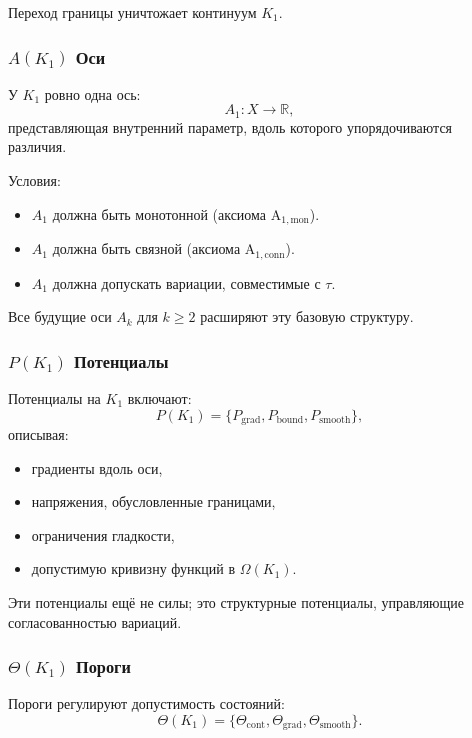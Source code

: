 Переход границы уничтожает континуум $K_1$.

\subsubsection{\texorpdfstring{$A(K_1)$}{A(K_1)} Оси}

У $K_1$ ровно одна ось:
\[
A_1 : X \to \mathbb{R},
\]
представляющая внутренний параметр, вдоль которого упорядочиваются
различия.

Условия:
\begin{itemize}
    \item $A_1$ должна быть монотонной (аксиома A$_{1,\text{mon}}$).
    \item $A_1$ должна быть связной (аксиома A$_{1,\text{conn}}$).
    \item $A_1$ должна допускать вариации, совместимые с $\tau$.
\end{itemize}

Все будущие оси $A_k$ для $k \ge 2$ расширяют эту базовую структуру.

\subsubsection{\texorpdfstring{$P(K_1)$}{P(K_1)} Потенциалы}

Потенциалы на $K_1$ включают:
\[
P(K_1) = \{ P_{\mathrm{grad}}, P_{\mathrm{bound}}, P_{\mathrm{smooth}} \},
\]
описывая:
\begin{itemize}
    \item градиенты вдоль оси,
    \item напряжения, обусловленные границами,
    \item ограничения гладкости,
    \item допустимую кривизну функций в $\Omega(K_1)$.
\end{itemize}

Эти потенциалы ещё не силы; это структурные потенциалы, управляющие
согласованностью вариаций.

\subsubsection{\texorpdfstring{$\Theta(K_1)$}{\Theta(K_1)} Пороги}

Пороги регулируют допустимость состояний:
\[
\Theta(K_1) = \{ \Theta_{\mathrm{cont}}, \Theta_{\mathrm{grad}},
                 \Theta_{\mathrm{smooth}} \}.
\]

